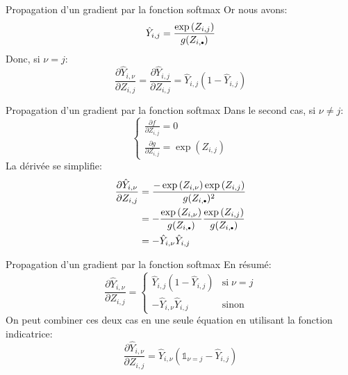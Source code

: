 \begin{frame}{Propagation d'un gradient par la fonction softmax}
	Or nous avons:
	\begin{equation*}
		\hat{Y}_{i,j} = \frac{\exp{(Z_{i,j})}}{g(Z_{i,\bigdot})}
	\end{equation*}
	\pause
	Donc, si $\nu = j$:
	\begin{equation*}
		\frac{\partial{\hat{Y}_{i,\nu}}}{\partial{Z_{i,j}}} = \frac{\partial{\hat{Y}_{i,j}}}{\partial{Z_{i,j}}} = \hat{Y}_{i,j} \left(1 - \hat{Y}_{i,j}\right)
	\end{equation*}	
\end{frame}

\begin{frame}{Propagation d'un gradient par la fonction softmax}
	Dans le second cas, si $\nu \ne j$:
	\begin{equation*}
		\begin{cases}
			\frac{\partial{f}}{\partial{Z_{i,j}}} = 0 \\
			\frac{\partial{g}}{\partial{Z_{i,j}}} = \exp{(Z_{i,j})}
		\end{cases}
	\end{equation*}
	\pause
	La dérivée se simplifie:
	\begin{equation*}
		\begin{aligned}
			\frac{\partial{\hat{Y}_{i,\nu}}}{\partial{Z_{i,j}}}
			&= \frac{- \exp{(Z_{i,\nu})} \exp{(Z_{i,j})}}{g(Z_{i,\bigdot})^2} \\
			&= -\frac{\exp{(Z_{i,\nu})}}{g(Z_{i,\bigdot})} \frac{\exp{(Z_{i,j})}}{g(Z_{i,\bigdot})} \\
			&= - \hat{Y}_{i,\nu} \hat{Y}_{i,j}
		\end{aligned}
	\end{equation*}
\end{frame}

\begin{frame}{Propagation d'un gradient par la fonction softmax}
	En résumé:
	\begin{equation*}
		\frac{\partial{\hat{Y}_{i,\nu}}}{\partial{Z_{i,j}}} =
		\begin{cases}
			\hat{Y}_{i,j} \left(1 - \hat{Y}_{i,j}\right) & \text{si} \; \nu = j \\
			- \hat{Y}_{i,\nu} \hat{Y}_{i,j}              & \text{sinon}
		\end{cases}
	\end{equation*}
	\pause
	On peut combiner ces deux cas en une seule équation en utilisant la fonction indicatrice:
	\begin{equation*}
		\frac{\partial{\hat{Y}_{i,\nu}}}{\partial{Z_{i,j}}} = \hat{Y}_{i,\nu} \left(\mathbb{1}_{\nu=j} - \hat{Y}_{i,j}\right)
	\end{equation*}
\end{frame}

